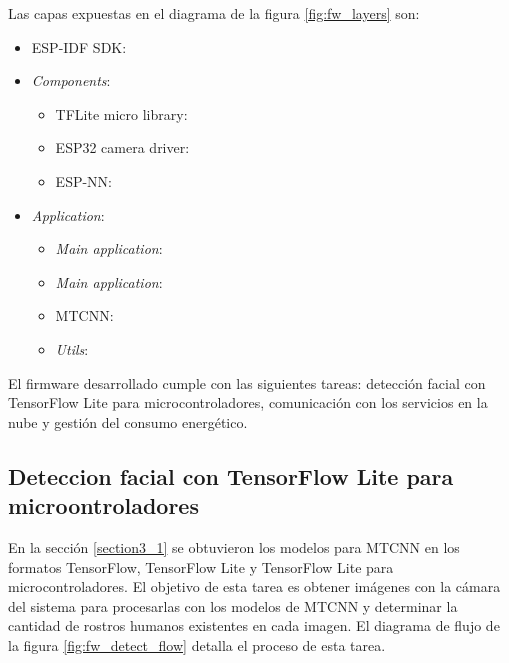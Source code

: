 Las capas expuestas en el diagrama de la figura \ref{fig:fw_layers} son:
\begin{itemize}
	\item ESP-IDF SDK:
	\item \textit{Components}:
	\begin{itemize}
		\item TFLite micro library:
		\item ESP32 camera driver:
		\item ESP-NN:
	\end{itemize}
	\item \textit{Application}:
	\begin{itemize}
		\item \textit{Main application}:
		\item \textit{Main application}:
		\item MTCNN:
		\item \textit{Utils}:
	\end{itemize}
\end{itemize}

El firmware desarrollado cumple con las siguientes tareas: detección facial con TensorFlow Lite para microcontroladores, comunicación con los servicios en la nube y gestión del consumo energético.

\subsection{Deteccion facial con TensorFlow Lite para microontroladores}
En la sección \ref{section3_1} se obtuvieron los modelos para MTCNN en los formatos TensorFlow, TensorFlow Lite y TensorFlow Lite para microcontroladores. El objetivo de esta tarea es obtener imágenes con la cámara del sistema para procesarlas con los modelos de MTCNN y determinar la cantidad  de rostros humanos existentes en cada imagen. El diagrama de flujo de la figura \ref{fig:fw_detect_flow} detalla el proceso de esta tarea.

